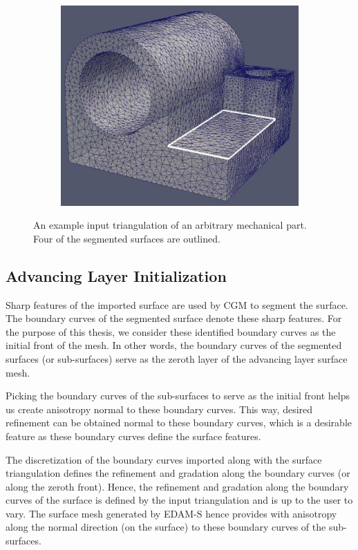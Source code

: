 \begin{figure}
\begin{subfigure}{.5\textwidth}
  \caption{}
  \label{surf2}
\end{subfigure}%
\begin{subfigure}{.5\textwidth}
  \centering
  \includegraphics[width=.8\linewidth]{img/m1/surfSegmentation/surf7.eps}
  \caption{}
  \label{surf3}
\end{subfigure}
\caption{An example input triangulation of an arbitrary mechanical part. Four of the segmented surfaces are outlined.}
\label{fig-surfSegment}
\end{figure}

\subsection{Advancing Layer Initialization}

Sharp features of the imported surface are used by CGM to segment the surface. The boundary curves of the segmented surface denote these sharp features. For the purpose of this thesis, we consider these identified boundary curves as the initial front of the mesh. In other words, the boundary curves of the segmented surfaces (or sub-surfaces) serve as the zeroth layer of the advancing layer surface mesh.

Picking the boundary curves of the sub-surfaces to serve as the initial front helps us create anisotropy normal to these boundary curves. This way, desired refinement can be obtained normal to these boundary curves, which is a desirable feature as these boundary curves define the surface features.

The discretization of the boundary curves imported along with the surface triangulation defines the refinement and gradation along the boundary curves (or along the zeroth front). Hence, the refinement and gradation along the boundary curves of the surface is defined by the input triangulation and is up to the user to vary. The surface mesh generated by EDAM-S hence provides with anisotropy along the normal direction (on the surface) to these boundary curves of the sub-surfaces.

